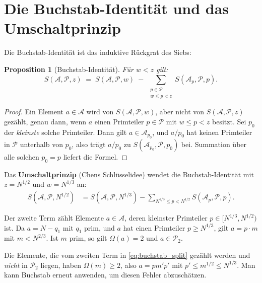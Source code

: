 \documentclass[12pt,a4paper]{amsart}
\newtheorem{proposition}[theorem]{Proposition}
\theoremstyle{definition}
\newcommand{\Ptwo}{\mathcal{P}_2}
\newcommand{\OOmega}{\Omega}
\begin{document}
\section{Die Buchstab-Identität und das Umschaltprinzip}

Die Buchstab-Identität ist das induktive Rückgrat des Siebs:

\begin{proposition}[Buchstab-Identität]\label{prop:buchstab}
  Für $w < z$ gilt:
  \[
    S(\mathcal{A}, \mathcal{P}, z)
    \;=\;
    S(\mathcal{A}, \mathcal{P}, w)
    \;-\;
    \sum_{\substack{p \in \mathcal{P} \\ w \leq p < z}}
    S(\mathcal{A}_p, \mathcal{P}, p).
  \]
\end{proposition}

\begin{proof}
  Ein Element $a \in \mathcal{A}$ wird von $S(\mathcal{A},\mathcal{P},w)$,
  aber nicht von $S(\mathcal{A},\mathcal{P},z)$ gezählt, genau dann, wenn
  $a$ einen Primteiler $p \in \mathcal{P}$ mit $w \leq p < z$ besitzt.
  Sei $p_0$ der \emph{kleinste} solche Primteiler.  Dann gilt
  $a \in \mathcal{A}_{p_0}$, und $a/p_0$ hat keinen Primteiler in
  $\mathcal{P}$ unterhalb von $p_0$, also trägt $a/p_0$ zu
  $S(\mathcal{A}_{p_0}, \mathcal{P}, p_0)$ bei.  Summation über alle
  solchen $p_0 = p$ liefert die Formel.  \qedhere
\end{proof}

Das \textbf{Umschaltprinzip} (Chens Schlüsselidee) wendet die
Buchstab-Identität mit $z = N^{1/2}$ und $w = N^{1/3}$ an:
\begin{align}
  S(\mathcal{A}, \mathcal{P}, N^{1/2})
  &= S(\mathcal{A}, \mathcal{P}, N^{1/3})
  - \sum_{N^{1/3} \leq p < N^{1/2}} S(\mathcal{A}_p, \mathcal{P}, p).
  \label{eq:buchstab_split}
\end{align}

Der zweite Term zählt Elemente $a \in \mathcal{A}$, deren kleinster
Primteiler $p \in [N^{1/3}, N^{1/2})$ ist.  Da $a = N - q_1$ mit $q_1$
prim, und $a$ hat einen Primteiler $p \geq N^{1/3}$, gilt $a = p \cdot m$
mit $m < N^{2/3}$.  Ist $m$ prim, so gilt $\OOmega(a) = 2$ und
$a \in \Ptwo$.

Die Elemente, die vom zweiten Term in \eqref{eq:buchstab_split} gezählt
werden und \emph{nicht} in $\Ptwo$ liegen, haben $\OOmega(m) \geq 2$,
also $a = pm'p'$ mit $p' \leq m^{1/2} \leq N^{1/3}$.  Man kann Buchstab
erneut anwenden, um diesen Fehler abzuschätzen.
\end{document}

